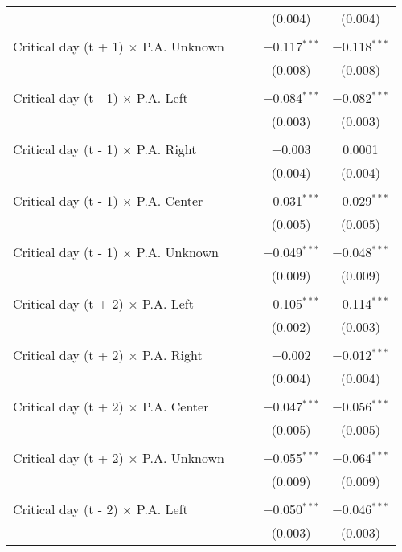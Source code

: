\documentclass[
]{article}
\begin{document}
\begin{table}[!htbp]
{\begin{tabular}{@{\extracolsep{5pt}}lcccc}
  &  &  & (0.004) & (0.004) \\ 
  & & & & \\ 
 Critical day (t + 1) $\times$ P.A. Unknown &  &  & $-$0.117$^{***}$ & $-$0.118$^{***}$ \\ 
  &  &  & (0.008) & (0.008) \\ 
  & & & & \\ 
 Critical day (t - 1) $\times$ P.A. Left &  &  & $-$0.084$^{***}$ & $-$0.082$^{***}$ \\ 
  &  &  & (0.003) & (0.003) \\ 
  & & & & \\ 
 Critical day (t - 1) $\times$ P.A. Right &  &  & $-$0.003 & 0.0001 \\ 
  &  &  & (0.004) & (0.004) \\ 
  & & & & \\ 
 Critical day (t - 1) $\times$ P.A. Center &  &  & $-$0.031$^{***}$ & $-$0.029$^{***}$ \\ 
  &  &  & (0.005) & (0.005) \\ 
  & & & & \\ 
 Critical day (t - 1) $\times$ P.A. Unknown &  &  & $-$0.049$^{***}$ & $-$0.048$^{***}$ \\ 
  &  &  & (0.009) & (0.009) \\ 
  & & & & \\ 
 Critical day (t + 2) $\times$ P.A. Left &  &  & $-$0.105$^{***}$ & $-$0.114$^{***}$ \\ 
  &  &  & (0.002) & (0.003) \\ 
  & & & & \\ 
 Critical day (t + 2) $\times$ P.A. Right &  &  & $-$0.002 & $-$0.012$^{***}$ \\ 
  &  &  & (0.004) & (0.004) \\ 
  & & & & \\ 
 Critical day (t + 2) $\times$ P.A. Center &  &  & $-$0.047$^{***}$ & $-$0.056$^{***}$ \\ 
  &  &  & (0.005) & (0.005) \\ 
  & & & & \\ 
 Critical day (t + 2) $\times$ P.A. Unknown &  &  & $-$0.055$^{***}$ & $-$0.064$^{***}$ \\ 
  &  &  & (0.009) & (0.009) \\ 
  & & & & \\ 
 Critical day (t - 2) $\times$ P.A. Left &  &  & $-$0.050$^{***}$ & $-$0.046$^{***}$ \\ 
  &  &  & (0.003) & (0.003) \\ 

\end{tabular}}
\end{table}
\end{document}
